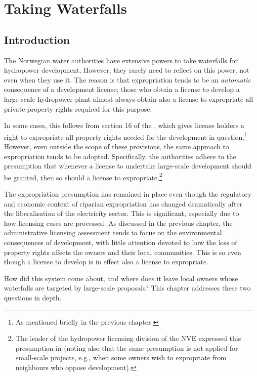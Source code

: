\chapter{Taking Waterfalls}\label{chap:5}

\section{Introduction}\label{sec:5:1}

The Norwegian water authorities have extensive powers to take waterfalls for hydropower development. However, they rarely need to reflect on this power, not even when they use it. The reason is that expropriation tends to be an {\it automatic} consequence of a development license; those who obtain a license to develop a large-scale hydropower plant almost always obtain also a license to expropriate all private property rights required for this purpose.

In some cases, this follows from section 16 of the \cite{wra17}, which gives license holders a right to expropriate all property rights needed for the development in question.\footnote{As mentioned briefly in the previous chapter.} However, even outside the scope of these provisions, the same approach to expropriation tends to be adopted. Specifically, the authorities adhere to the presumption that whenever a license to undertake large-scale development should be granted, then so should a license to expropriate.\footnote{The leader of the hydropower licensing division of the NVE expressed this presumption in  \cite{flatby08} (noting also that the same presumption is not applied for small-scale projects, e.g., when some owners wish to expropriate from neighbours who oppose development).}

The expropriation presumption has remained in place even though the regulatory and economic context of riparian expropriation has changed dramatically after the liberalisation of the electricity sector.
This is significant, especially due to how licensing cases are processed. As discussed in the previous chapter, the administrative licensing assessment tends to focus on the environmental consequences of development, with little attention devoted to how the loss of property rights affects the owners and their local communities. This is so even though a license to develop is in effect also a license to expropriate.

How did this system come about, and where does it leave local owners whose waterfalls are targeted by large-scale proposals? This chapter addresses these two questions in depth. 

